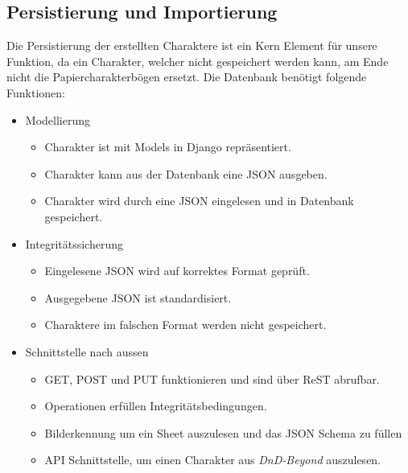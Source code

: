 \subsection{Persistierung und Importierung}\label{subsec:database_and_import}
Die Persistierung der erstellten Charaktere ist ein Kern Element für unsere Funktion, da ein Charakter, welcher nicht
gespeichert werden kann, am Ende nicht die Papiercharakterbögen ersetzt.
Die Datenbank benötigt folgende Funktionen:
\begin{itemize}
    \item Modellierung
    \begin{itemize}
        \item Charakter ist mit Models in Django repräsentiert.
        \item Charakter kann aus der Datenbank eine JSON ausgeben.
        \item Charakter wird durch eine JSON eingelesen und in Datenbank gespeichert.
    \end{itemize}
    \item Integritätssicherung
    \begin{itemize}
        \item Eingelesene JSON wird auf korrektes Format geprüft.
        \item Ausgegebene JSON ist standardisiert.
        \item Charaktere im falschen Format werden nicht gespeichert.
    \end{itemize}
    \item Schnittstelle nach aussen
    \begin{itemize}
        \item GET, POST und PUT funktionieren und sind über ReST abrufbar.
        \item Operationen erfüllen Integritätsbedingungen.
        \item Bilderkennung um ein Sheet auszulesen und das JSON Schema zu füllen
        \item API Schnittstelle, um einen Charakter aus \textit{DnD-Beyond} auszulesen.
    \end{itemize}
\end{itemize}


